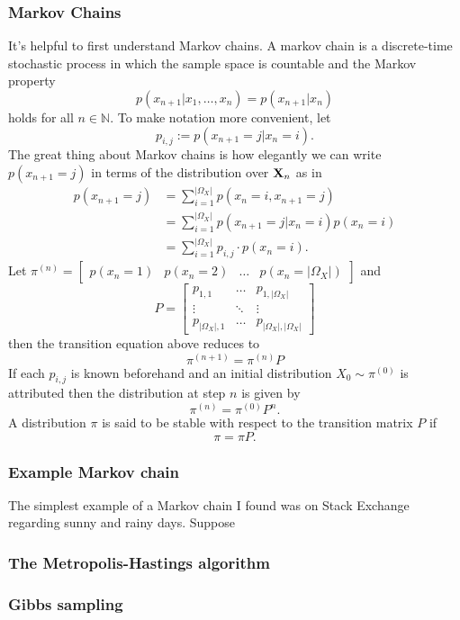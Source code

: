 \documentclass[11pt]{article}
\begin{document}
\begin{appendices}
\subsubsection{Markov Chains}
It's helpful to first understand Markov chains. A markov chain is a discrete-time stochastic process in which the sample space is countable and the Markov property
$$
p(x_{n+1}|x_1,\dots,x_n)
=
p(x_{n+1}|x_n)
$$
holds for all $n\in\mathbb{N}$. To make notation more convenient, let
$$
p_{i,j}
:=
p(x_{n+1}=j|x_n=i).
$$
The great thing about Markov chains is how elegantly we can write $p(x_{n+1}=j)$ in terms of the distribution over $\mathbf{X}_n$ as in
\begin{align*}
    p(x_{n+1}=j)
    &=
    \sum_{i=1}^{|\Omega_X|} p(x_n=i,x_{n+1}=j)\\
    &=
    \sum_{i=1}^{|\Omega_X|} p(x_{n+1}=j|x_n=i)p(x_n=i)\\
    &=
    \sum_{i=1}^{|\Omega_X|} p_{i,j}\cdot p(x_n=i).
\end{align*}
Let $\pi^{(n)}=\begin{bmatrix} p(x_n=1) & p(x_n=2) & \dots & p(x_n=|\Omega_X|)\end{bmatrix}$ and
$$
P
=
\begin{bmatrix}
    p_{1,1}          & \dots  & p_{1,|\Omega_X|}\\
    \vdots           & \ddots & \vdots          \\
    p_{|\Omega_X|,1} & \dots  & p_{|\Omega_X|, |\Omega_X|}
\end{bmatrix}
$$
then the transition equation above reduces to
$$
\pi^{(n+1)}
=
\pi^{(n)}P
$$
If each $p_{i,j}$ is known beforehand and an initial distribution $X_0\sim\pi^{(0)}$ is attributed then the distribution at step $n$ is given by
$$
\pi^{(n)}
=
\pi^{(0)}P^n.
$$
A distribution $\pi$ is said to be stable with respect to the transition matrix $P$ if
$$
\pi
=
\pi P.
$$

\subsubsection*{Example Markov chain}
The simplest example of a Markov chain I found was on Stack Exchange regarding sunny and rainy days. Suppose 

\subsubsection{The Metropolis-Hastings algorithm}

\subsubsection{Gibbs sampling}


\end{appendices}
\end{document}
